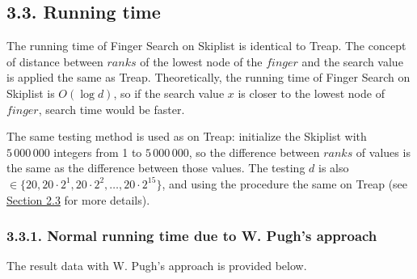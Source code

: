 \documentclass[12pt,english,]{article}
\begin{document}
\hypertarget{running-time}{%
\subsection{3.3. Running time}\label{running-time}}

The running time of Finger Search on Skiplist is identical to Treap. The
concept of distance between \(ranks\) of the lowest node of the
\(finger\) and the search value is applied the same as Treap.
Theoretically, the running time of Finger Search on Skiplist is
\(O(\log d)\), so if the search value \(x\) is closer to the lowest node
of \(finger\), search time would be faster.

The same testing method is used as on Treap: initialize the Skiplist
with \(5\,000\,000\) integers from 1 to \(5\,000\,000\), so the
difference between \(ranks\) of values is the same as the difference
between those values. The testing \(d\) is also
\(\in \{20, 20\cdot 2^1, 20\cdot 2^2, \ldots, 20\cdot 2^{15}\}\), and
using the procedure the same on Treap (see
\protect\hyperlink{section2.3}{Section 2.3} for more details).

\hypertarget{section3.3.1}{%
\subsubsection{3.3.1. Normal running time due to W. Pugh's
approach}\label{section3.3.1}}

The result data with W. Pugh's approach is provided below.
\end{document}
